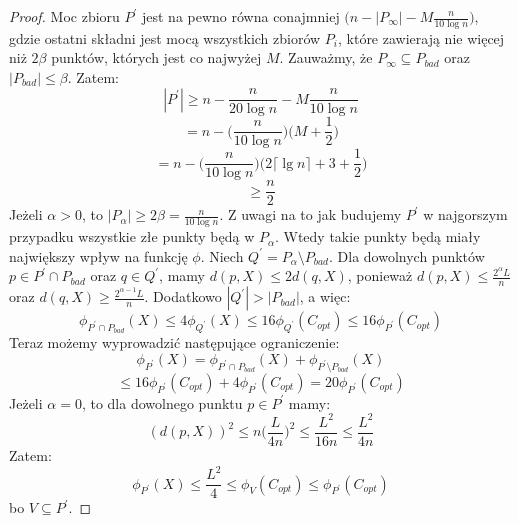\begin{proof}
    Moc zbioru $P^{'}$ jest na pewno równa conajmniej $\Big(n - |P_{\infty}| - M\frac{n}{10 \log n} \Big)$, gdzie ostatni składni jest mocą wszystkich zbiorów $P_{i}$, które zawierają nie więcej niż $2\beta$ punktów, których jest co najwyżej $M$.
    Zauważmy, że $P_{\infty} \subseteq P_{bad}$ oraz $|P_{bad}| \leq \beta$.
    Zatem:
    \begin{equation}
        |P^{'}| \geq n - \frac{n}{20 \log n} - M \frac{n}{10 \log n}
    \end{equation}
    \begin{equation}
        = n - \Big(\frac{n}{10 \log n}\Big) \Big(M + \frac{1}{2}\Big)
    \end{equation}
    \begin{equation}
        = n - \Big(\frac{n}{10 \log n}\Big) \Big(2 \lceil \lg n \rceil + 3 + \frac{1}{2}\Big)
    \end{equation}
    \begin{equation}
        \geq \frac{n}{2}
    \end{equation}
    Jeżeli $\alpha > 0$, to $|P_{\alpha}| \geq 2\beta = \frac{n}{10 \log n}$.
    Z uwagi na to jak budujemy $P^{'}$ w najgorszym przypadku wszystkie złe punkty będą w $P_{\alpha}$.
    Wtedy takie punkty będą miały największy wpływ na funkcję $\phi$.
    Niech $Q^{'} = P_{\alpha} \setminus P_{bad}$.
    Dla dowolnych punktów $p \in P^{'} \cap P_{bad}$ oraz $q \in Q^{'}$, mamy $d(p, X) \leq 2d(q,X)$, ponieważ $d(p, X) \leq \frac{2^{\alpha}L}{n}$ oraz $d(q, X) \geq \frac{2^{\alpha-1}L}{n}$.
    Dodatkowo $|Q^{'}| > |P_{bad}|$, a więc:
    \begin{equation}
        \phi_{P^{'} \cap P_{bad}}(X) \leq 4\phi_{Q^{'}}(X) \leq 16\phi_{Q^{'}}(C_{opt}) \leq 16\phi_{P^{'}}(C_{opt})
    \end{equation}
    Teraz możemy wyprowadzić następujące ograniczenie:
    \begin{equation}
        \phi_{P^{'}}(X) = \phi_{P^{'} \cap P_{bad}}(X) + \phi_{P^{'} \setminus P_{bad}}(X)
    \end{equation}
    \begin{equation}
        \leq 16\phi_{P^{'}}(C_{opt}) + 4\phi_{P^{'}}(C_{opt}) = 20\phi_{P^{'}}(C_{opt})
    \end{equation}
    Jeżeli $\alpha = 0$, to dla dowolnego punktu $p \in P^{'}$ mamy:
    \begin{equation}
        (d(p,X))^2 \leq n\Big(\frac{L}{4n}\Big)^2 \leq \frac{L^{2}}{16n} \leq \frac{L^{2}}{4n}
    \end{equation}
    Zatem:
    \begin{equation}
        \phi_{P^{'}}(X) \leq \frac{L^{2}}{4} \leq \phi_{V}(C_{opt}) \leq \phi_{P^{'}}(C_{opt})
    \end{equation}
    bo $V \subseteq P^{'}$.
\end{proof}

